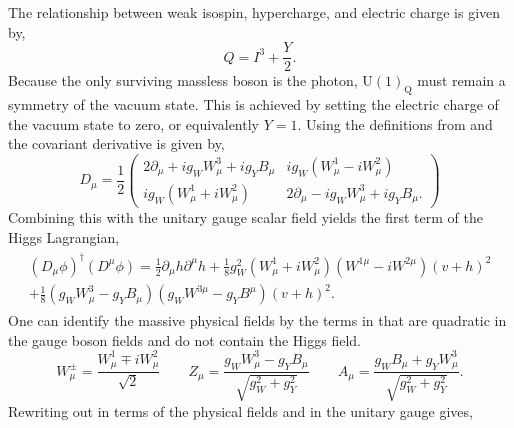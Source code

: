 The relationship between weak isospin, hypercharge, and electric charge is given by,
\begin{equation}
    \label{eq:hypercharge}
    Q = I^3 + \frac{Y}{2}.
\end{equation}
Because the only surviving massless boson is the photon, $\text{U}(1)_\text{Q}$ must remain a symmetry of the vacuum state.
This is achieved by setting the electric charge of the vacuum state to zero, or equivalently $Y=1$.
Using the definitions from  and  the covariant derivative is given by,
\begin{equation}
    \label{eq:higgs_covariant_derivative}
    D_\mu = \frac{1}{2}
    \begin{pmatrix}
        2 \partial_\mu + i g_W W_\mu^3 + i g_Y B_\mu &
        i g_W (W_\mu^1 - i W_\mu^2)                    \\
        i g_W (W_\mu^1 + i W_\mu^2)                  &
        2 \partial_\mu - i g_W W_\mu^3 + i g_Y B_\mu.
    \end{pmatrix}
\end{equation}
Combining this with the unitary gauge scalar field yields the first term of the Higgs Lagrangian,
\begin{align}
    \label{eq:higgs_lagrangian_1}
    \begin{split}
        (D_\mu \phi)^\dagger (D^\mu \phi) =
        \frac{1}{2} \partial_\mu h \partial^\mu h
        + \frac{1}{8} g_W^2 (W_\mu^1 + i W_\mu^2)(W^{1\mu} - i W^{2\mu})(v + h)^2
        \\
        + \frac{1}{8} (g_W W_\mu^3 - g_Y B_\mu)(g_W W^{3\mu} - g_Y B^\mu)(v + h)^2.
    \end{split}
\end{align}
One can identify the massive physical fields by the terms in  that are quadratic in the gauge boson fields and do not contain the Higgs field.
\begin{equation}
    W^\pm_\mu = \frac{W^1_\mu \mp i W^2_\mu}{\sqrt{2}}
    \qquad
    Z_\mu = \frac{g_W W^3_\mu - g_Y B_\mu}{\sqrt{g_W^2 + g_Y^2}}
    \qquad
    A_\mu = \frac{g_W B_\mu + g_Y W^3_\mu}{\sqrt{g_W^2 + g_Y^2}}.
\end{equation}
Rewriting out  in terms of the physical fields and in the unitary gauge gives,
